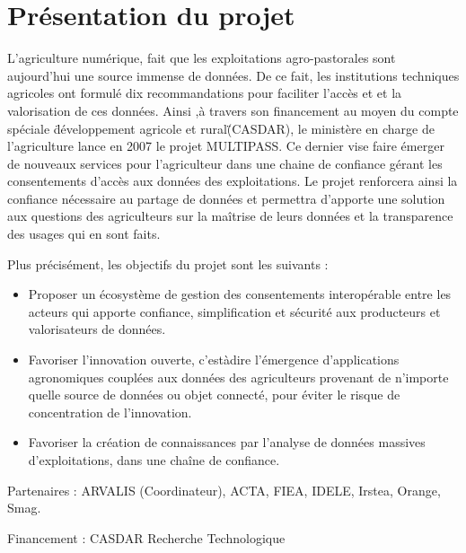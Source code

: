 \section{Présentation du projet} 
L'agriculture numérique, fait que les exploitations agro-pastorales sont aujourd’hui une source immense de données. De ce fait, les institutions techniques agricoles ont formulé dix recommandations pour faciliter l’accès et et la valorisation de ces données. Ainsi ,à travers son financement au moyen du compte spéciale \"développement agricole et rural\" (CASDAR), le ministère en charge de l’agriculture lance en 2007 le projet  MULTIPASS. Ce dernier vise faire émerger de nouveaux services pour l’agriculteur dans une chaine de confiance gérant les consentements d’accès aux données des exploitations. Le projet renforcera ainsi la confiance nécessaire au partage de données et permettra d’apporte une solution aux questions des agriculteurs sur la maîtrise de leurs données et la transparence des usages qui en sont faits. 

Plus précisément, les objectifs du projet sont les suivants : 

\begin{itemize}
    \item Proposer un écosystème de gestion des consentements interopérable entre les acteurs qui apporte confiance, simplification et sécurité aux producteurs et valorisateurs de données. 
    \item Favoriser l’innovation ouverte, c’est\-à\-dire l’émergence d’applications agronomiques couplées aux données des agriculteurs provenant de n’importe quelle source de données ou objet connecté, pour éviter le risque de concentration de l’innovation. 
    \item Favoriser la création de connaissances par l’analyse de données massives d’exploitations, dans une chaîne de confiance. 
\end{itemize}

Partenaires : ARVALIS (Coordinateur), ACTA, FIEA, IDELE, Irstea, Orange, Smag.

Financement : \gls{CASDAR} Recherche Technologique 